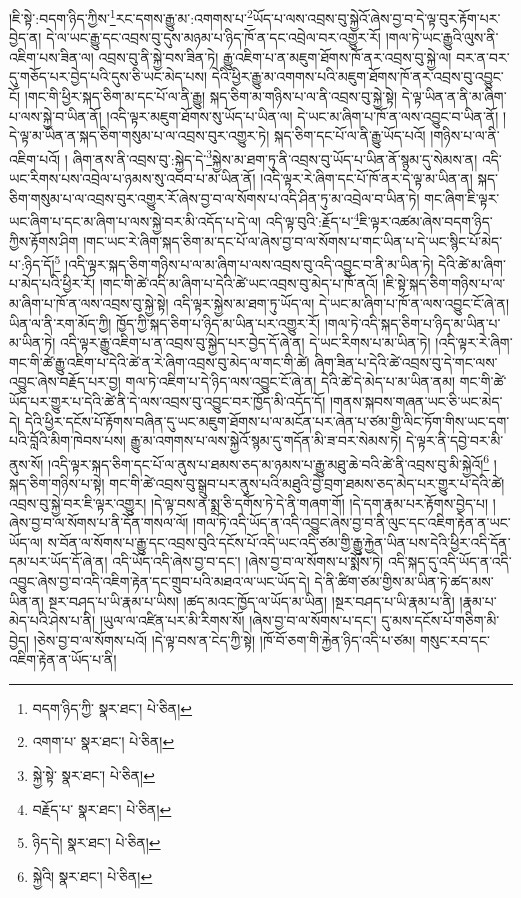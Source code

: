 །ཇི་སྟེ་:བདག་ཉིད་ཀྱིས་\footnote{བདག་ཉིད་ཀྱི་  སྣར་ཐང་།  པེ་ཅིན། }རང་དགས་རྒྱུ་མ་:འགགས་པ་\footnote{འགག་པ་  སྣར་ཐང་།  པེ་ཅིན། }ཡོད་པ་ལས་འབྲས་བུ་སྐྱེའོ་ཞེས་བྱ་བ་དེ་ལྟ་བུར་རྟོག་པར་བྱེད་ན། དེ་ལ་ཡང་རྒྱུ་དང་འབྲས་བུ་དུས་མཉམ་པ་ཉིད་ཁོ་ན་དང་འབྲེལ་བར་འགྱུར་རོ། །གལ་ཏེ་ཡང་རྒྱུའི་ལུས་ནི་འཇིག་པས་ཟིན་ལ། འབྲས་བུ་ནི་སྐྱེ་བས་ཟིན་ཏེ། རྒྱུ་འཇིག་པ་ན་མཇུག་ཐོགས་ཁོ་ནར་འབྲས་བུ་སྐྱེ་ལ། བར་ན་བར་དུ་གཅོད་པར་བྱེད་པའི་དུས་ཅི་ཡང་མེད་པས། དེའི་ཕྱིར་རྒྱུ་མ་འགགས་པའི་མཇུག་ཐོགས་ཁོ་ནར་འབྲས་བུ་འབྱུང་ངོ། །གང་གི་ཕྱིར་སྐད་ཅིག་མ་དང་པོ་ལ་ནི་རྒྱུ། སྐད་ཅིག་མ་གཉིས་པ་ལ་ནི་འབྲས་བུ་སྐྱེ་སྟེ། དེ་ལྟ་ཡིན་ན་ནི་མ་ཞིག་པ་ལས་སྐྱེ་བ་ཡིན་ནོ། །འདི་ལྟར་མཇུག་ཐོགས་སུ་ཡོད་པ་ཡིན་ལ། དེ་ཡང་མ་ཞིག་པ་ཁོ་ན་ལས་འབྱུང་བ་ཡིན་ནོ། །དེ་ལྟ་མ་ཡིན་ན་སྐད་ཅིག་གསུམ་པ་ལ་འབྲས་བུར་འགྱུར་ཏེ། སྐད་ཅིག་དང་པོ་ལ་ནི་རྒྱུ་ཡོད་པའོ། །གཉིས་པ་ལ་ནི་འཇིག་པའོ། །
ཞིག་ནས་ནི་འབྲས་བུ་:སྐྱེད་དེ་\footnote{སྐྱེ་སྟེ་  སྣར་ཐང་།  པེ་ཅིན། }སྐྱེས་མ་ཐག་ཏུ་ནི་འབྲས་བུ་ཡོད་པ་ཡིན་ནོ་སྙམ་དུ་སེམས་ན། འདི་ཡང་རིགས་པས་འབྲེལ་པ་ཉམས་སུ་འབབ་པ་མ་ཡིན་ནོ། །འདི་ལྟར་རེ་ཞིག་དང་པོ་ཁོ་ནར་དེ་ལྟ་མ་ཡིན་ན། སྐད་ཅིག་གསུམ་པ་ལ་འབྲས་བུར་འགྱུར་རོ་ཞེས་བྱ་བ་ལ་སོགས་པ་འདི་ཤིན་ཏུ་མ་འབྲེལ་བ་ཡིན་ཏེ། གང་ཞིག་ཇི་ལྟར་ཡང་ཞིག་པ་དང་མ་ཞིག་པ་ལས་སྐྱེ་བར་མི་འདོད་པ་དེ་ལ། འདི་ལྟ་བུའི་:རྗོད་པ་\footnote{བརྗོད་པ་  སྣར་ཐང་།  པེ་ཅིན། }ཇི་ལྟར་འཚམ་ཞེས་བདག་ཉིད་ཀྱིས་རྟོགས་ཤིག །གང་ཡང་རེ་ཞིག་སྐད་ཅིག་མ་དང་པོ་ལ་ཞེས་བྱ་བ་ལ་སོགས་པ་གང་ཡིན་པ་དེ་ཡང་སྙིང་པོ་མེད་པ་:ཉིད་དོ།\footnote{ཉིད་དེ།  སྣར་ཐང་།  པེ་ཅིན། } །འདི་ལྟར་སྐད་ཅིག་གཉིས་པ་ལ་མ་ཞིག་པ་ལས་འབྲས་བུ་འདི་འབྱུང་བ་ནི་མ་ཡིན་ཏེ། དེའི་ཚེ་མ་ཞིག་པ་མེད་པའི་ཕྱིར་རོ། །གང་གི་ཚེ་འདི་མ་ཞིག་པ་དེའི་ཚེ་ཡང་འབྲས་བུ་མེད་པ་ཁོ་ནའོ། །ཇི་སྟེ་སྐད་ཅིག་གཉིས་པ་ལ་མ་ཞིག་པ་ཁོ་ན་ལས་འབྲས་བུ་སྐྱེ་སྟེ། འདི་ལྟར་སྐྱེས་མ་ཐག་ཏུ་ཡོད་ལ། དེ་ཡང་མ་ཞིག་པ་ཁོ་ན་ལས་འབྱུང་ངོ་ཞེ་ན། ཡིན་ལ་ནི་རག་མོད་ཀྱི། ཁྱོད་ཀྱི་སྐད་ཅིག་པ་ཉིད་མ་ཡིན་པར་འགྱུར་རོ། །གལ་ཏེ་འདི་སྐད་ཅིག་པ་ཉིད་མ་ཡིན་པ་མ་ཡིན་ཏེ། འདི་ལྟར་རྒྱུ་འཇིག་པ་ན་འབྲས་བུ་སྐྱེད་པར་བྱེད་དོ་ཞེ་ན། དེ་ཡང་རིགས་པ་མ་ཡིན་ཏེ། །འདི་ལྟར་རེ་ཞིག་གང་གི་ཚེ་རྒྱུ་འཇིག་པ་དེའི་ཚེ་ན་རེ་ཞིག་འབྲས་བུ་མེད་ལ་གང་གི་ཚེ། ཞིག་ཟིན་པ་དེའི་ཚེ་འབྲས་བུ་དེ་གང་ལས་འབྱུང་ཞེས་བརྗོད་པར་བྱ། གལ་ཏེ་འཇིག་པ་དེ་ཉིད་ལས་འབྱུང་ངོ་ཞེ་ན། དེའི་ཚེ་དེ་མེད་པ་མ་ཡིན་ནམ། གང་གི་ཚེ་ཡོད་པར་གྱུར་པ་དེའི་ཚེ་ནི་དེ་ལས་འབྲས་བུ་འབྱུང་བར་ཁྱོད་མི་འདོད་དོ། །གནས་སྐབས་གཞན་ཡང་ཅི་ཡང་མེད་དེ། དེའི་ཕྱིར་དངོས་པོ་རྟོགས་བཞིན་དུ་ཡང་མཇུག་ཐོགས་པ་ལ་མངོན་པར་ཞེན་པ་ཙམ་གྱི་ལིང་ཏོག་གིས་ཡང་དག་པའི་བློའི་མིག་ཁེབས་པས། རྒྱུ་མ་འགགས་པ་ལས་སྐྱེའོ་སྙམ་དུ་གདོན་མི་ཟ་བར་སེམས་ཏེ། དེ་ལྟར་ནི་དབྱེ་བར་མི་ནུས་སོ། །འདི་ལྟར་སྐད་ཅིག་དང་པོ་ལ་ནུས་པ་ཐམས་ཅད་མ་ཉམས་པ་རྒྱུ་མཐུ་ཆེ་བའི་ཚེ་ནི་འབྲས་བུ་མི་སྐྱེའོ།\footnote{སྐྱེའི།  སྣར་ཐང་།  པེ་ཅིན། } །སྐད་ཅིག་གཉིས་པ་སྟེ། གང་གི་ཚེ་འབྲས་བུ་སྒྲུབ་པར་ནུས་པའི་མཐུའི་བྱེ་བྲག་ཐམས་ཅད་མེད་པར་གྱུར་པ་དེའི་ཚེ། འབྲས་བུ་སྐྱེ་བར་ཇི་ལྟར་འགྱུར། །དེ་ལྟ་བས་ན་སྨྲ་ཅི་དགོས་ཏེ་དེ་ནི་གཞག་གོ། །དེ་དག་རྣམ་པར་རྟོགས་བྱེད་པ། །ཞེས་བྱ་བ་ལ་སོགས་པ་ནི་དོན་གསལ་ལོ། །གལ་ཏེ་འདི་ཡོད་ན་འདི་འབྱུང་ཞེས་བྱ་བ་ནི་ལུང་དང་འཇིག་རྟེན་ན་ཡང་ཡོད་ལ། ས་བོན་ལ་སོགས་པ་རྒྱུ་དང་འབྲས་བུའི་དངོས་པོ་འདི་ཡང་འདི་ཙམ་གྱི་རྒྱུ་རྐྱེན་ཡིན་པས་དེའི་ཕྱིར་འདི་དོན་དམ་པར་ཡོད་དོ་ཞེ་ན། འདི་ཡོད་འདི་ཞེས་བྱ་བ་དང་། །ཞེས་བྱ་བ་ལ་སོགས་པ་སྨོས་ཏེ། འདི་སྐད་དུ་འདི་ཡོད་ན་འདི་འབྱུང་ཞེས་བྱ་བ་འདི་འཇིག་རྟེན་དང་གྲུབ་པའི་མཐའ་ལ་ཡང་ཡོད་དེ། དེ་ནི་ཚིག་ཙམ་གྱིས་མ་ཡིན་ཏེ་ཚད་མས་ཡིན་ན། སྔར་བཤད་པ་ཡི་རྣམ་པ་ཡིས། །ཚད་མའང་ཁྱོད་ལ་ཡོད་མ་ཡིན། །སྔར་བཤད་པ་ཡི་རྣམ་པ་ནི། །རྣམ་པ་མེད་པའི་ཤེས་པ་ནི། །ཡུལ་ལ་འཛིན་པར་མི་རིགས་སོ། །ཞེས་བྱ་བ་ལ་སོགས་པ་དང་། དུ་མས་དངོས་པོ་གཅིག་མི་བྱེད། །ཅེས་བྱ་བ་ལ་སོགས་པའོ། །དེ་ལྟ་བས་ན་ངེད་ཀྱི་སྟེ། །ཁོ་བོ་ཅག་གི་རྐྱེན་ཉིད་འདི་པ་ཙམ། གསུང་རབ་དང་འཇིག་རྟེན་ན་ཡོད་པ་ནི། 